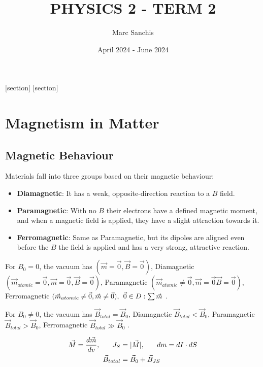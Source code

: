 \documentclass[a4paper]{article}
\title{PHYSICS 2 - TERM 2}
\author{Marc Sanchis}
\date{April 2024 - June 2024}
\begin{document}
\maketitle

\renewcommand{\contentsname}{}
\tableofcontents

\newpage
\restoregeometry
\pagestyle{fancy}
\setcounter{section}{4}

[section]
[section]
\setcounter{ex}{0}
\setcounter{prob}{0}

\section{Magnetism in Matter}

\subsection{Magnetic Behaviour}
Materials fall into three groups based on their magnetic behaviour:

\begin{itemize}
    \item \textbf{Diamagnetic}: It has a weak, opposite-direction reaction to a $B$ field.
    \item \textbf{Paramagnetic}: With no $B$ their electrons have a defined magnetic moment, and when a magnetic field is applied, they have a slight attraction towards it.
    \item \textbf{Ferromagnetic}: Same as Paramagnetic, but its dipoles are aligned even before the $B$ the field is applied and has a very strong, attractive reaction.
\end{itemize}

For $B_{0}=0$, the vacuum has $(\vec{m}=\vec{0}, \vec{B}=\vec{0})$, Diamagnetic $(\vec{m}_{atomic}=\vec{0}, \vec{m}=\vec{0},\vec{B}=\vec{0})$, Paramagnetic $(\vec{m}_{atomic}\neq \vec{0},\vec{m}=\vec{0}\vec{B}=\vec{0})$, Ferromagnetic $(\vec{m}_{atomic}\neq\vec{0},\vec{m}\neq\vec{0}),\hspace{1ex}\vec{0}\in D:\sum\vec{m}$ .

For $B_{0}\neq 0$, the vacuum has $\vec{B}_{total}=\vec{B}_{0}$, Diamagnetic $\vec{B}_{total}<\vec{B}_{0}$, Paramagnetic $\vec{B}_{total}>\vec{B}_{0}$, Ferromagnetic $\vec{B}_{total}\gg \vec{B}_{0}$ .

\begin{align}
\vec{M}=\frac{d\vec{m}}{dv},\hspace{4ex}J_{S}&=|\vec{M}|,\hspace{4ex}dm=dI\cdot dS \\
\vec{B}_{total}&=\vec{B}_{0}+\vec{B}_{JS}
\end{align}
\end{document}
